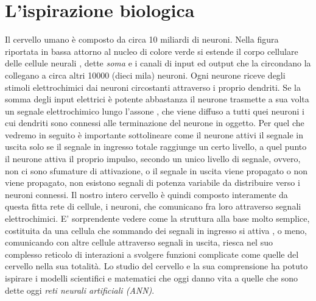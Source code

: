 \section*{L'ispirazione biologica}
\vspace{-2cm}
Il cervello umano è composto da circa 10 miliardi di neuroni. Nella figura riportata in bassa attorno al nucleo di colore verde si estende il corpo cellulare delle cellule neurali , dette \textit{soma} e i canali di input ed output che la circondano la collegano a circa altri 10000 (dieci mila) neuroni.
Ogni neurone riceve degli stimoli elettrochimici dai neuroni circostanti attraverso i proprio dendriti. Se la somma degli input elettrici è potente abbastanza il neurone trasmette a sua volta un segnale elettrochimico lungo l'assone , che viene diffuso a tutti quei neuroni i cui dendriti sono connessi alle terminazione del neurone in oggetto.
Per quel che vedremo in seguito è importante sottolineare come il neurone attivi il segnale in uscita solo se il segnale in ingresso totale raggiunge un certo livello, a quel punto il neurone attiva il proprio impulso, secondo un unico livello di segnale, ovvero, non ci sono sfumature di attivazione, o il segnale in uscita viene propagato o non viene propagato, non esistono segnali di potenza variabile da distribuire verso i neuroni connessi.
Il nostro intero cervello è quindi composto interamente da questa fitta rete di cellule, i neuroni, che comunicano fra loro attraverso segnali elettrochimici. E' sorprendente vedere come la struttura alla base molto semplice, costituita da una cellula che sommando dei segnali in ingresso si attiva , o meno, comunicando con altre cellule attraverso segnali in uscita, riesca nel suo complesso reticolo di interazioni a svolgere funzioni complicate come quelle del cervello nella sua totalità.
Lo studio del cervello e la sua comprensione ha potuto ispirare i modelli scientifici e matematici che oggi danno vita a quelle che sono dette oggi \textit{reti neurali artificiali (ANN)}.

